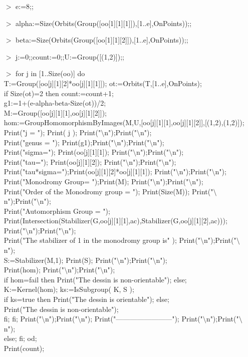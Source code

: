 \documentclass[12pt]{amsart}
\theoremstyle{remark}
\begin{document}
\begin{enumerate}
\item[$>$] e:=8;;
\item[$>$] alpha:=Size(Orbits(Group([oo[1][1][1]]),[1..e],OnPoints));;
\item[$>$] beta:=Size(Orbits(Group([oo[1][1][2]]),[1..e],OnPoints));;
\item[$>$] j:=0;;count:=0;;U:=Group([(1,2)]);;

\item[$>$] for j in [1..Size(oo)] do \\
T:=Group([oo[j][1][2]*oo[j][1][1]]); ot:=Orbits(T,[1..e],OnPoints);\\
if Size(ot)=2 then count:=count+1;\\
g1:=1+(e-alpha-beta-Size(ot))/2; \\
M:=Group([oo[j][1][1],oo[j][1][2]]);\\
hom:=GroupHomomorphismByImages(M,U,[oo[j][1][1],oo[j][1][2]],[(1,2),(1,2)]);\\
Print("j = "); Print( j ); 
Print("$\setminus$n");Print("$\setminus$n"); \\
Print("genus = "); Print(g1);Print("$\setminus$n");Print("$\setminus$n"); \\
Print("sigma="); Print(oo[j][1][1]); Print("$\setminus$n");Print("$\setminus$n"); \\
Print("tau="); Print(oo[j][1][2]); Print("$\setminus$n");Print("$\setminus$n"); \\
Print("tau*sigma=");Print(oo[j][1][2]*oo[j][1][1]); Print("$\setminus$n");Print("$\setminus$n"); \\
Print("Monodromy Group= ");Print(M); Print("$\setminus$n");Print("$\setminus$n"); \\
Print("Order of the Monodromy group = "); Print(Size(M)); Print("$\setminus$n");Print("$\setminus$n"); \\
Print("Automorphism Group = "); \\
Print(Intersection(Stabilizer(G,oo[j][1][1],ac),Stabilizer(G,oo[j][1][2],ac))); Print("$\setminus$n");Print("$\setminus$n"); \\
Print("The stabilizer of 1 in the monodromy group is" ); Print("$\setminus$n");Print("$\setminus$n"); \\
S:=Stabilizer(M,1); Print(S); Print("$\setminus$n");Print("$\setminus$n"); \\
Print(hom); Print("$\setminus$n");Print("$\setminus$n"); \\
if hom=fail then Print("The dessin is non-orientable"); else; \\
K:=Kernel(hom); ks:=IsSubgroup( K, S ); \\
if ks=true then Print("The dessin is orientable"); else;\\
Print("The dessin is non-orientable");\\
fi; fi; Print("$\setminus$n");Print("$\setminus$n"); Print("------------------------"); Print("$\setminus$n");Print("$\setminus$n"); \\
else; fi; od;\\
Print(count);\\

\end{enumerate}
\end{document}

